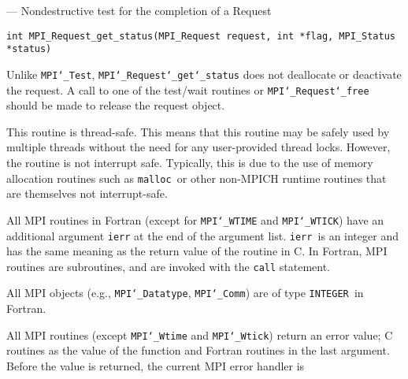 \startmanpage
{}
--- Nondestructive test for the completion of a Request 
\startvb\begin{verbatim}
int MPI_Request_get_status(MPI_Request request, int *flag, MPI_Status *status)

\end{verbatim}
\endvb

\par
{}
\par
{}
Unlike {\tt MPI{\tt \char`\_}Test}, {\tt MPI{\tt \char`\_}Request{\tt \char`\_}get{\tt \char`\_}status} does not deallocate or
deactivate the request.  A call to one of the test/wait routines or
{\tt MPI{\tt \char`\_}Request{\tt \char`\_}free} should be made to release the request object.
\par
{}
\par
This routine is thread-safe.  This means that this routine may be
safely used by multiple threads without the need for any user-provided
thread locks.  However, the routine is not interrupt safe.  Typically,
this is due to the use of memory allocation routines such as {\tt malloc
}or other non-MPICH runtime routines that are themselves not interrupt-safe.
\par
{}
All MPI routines in Fortran (except for {\tt MPI{\tt \char`\_}WTIME} and {\tt MPI{\tt \char`\_}WTICK}) have
an additional argument {\tt ierr} at the end of the argument list.  {\tt ierr
}is an integer and has the same meaning as the return value of the routine
in C.  In Fortran, MPI routines are subroutines, and are invoked with the
{\tt call} statement.
\par
All MPI objects (e.g., {\tt MPI{\tt \char`\_}Datatype}, {\tt MPI{\tt \char`\_}Comm}) are of type {\tt INTEGER
}in Fortran.
\par
{}
\par
All MPI routines (except {\tt MPI{\tt \char`\_}Wtime} and {\tt MPI{\tt \char`\_}Wtick}) return an error value;
C routines as the value of the function and Fortran routines in the last
argument.  Before the value is returned, the current MPI error handler is
